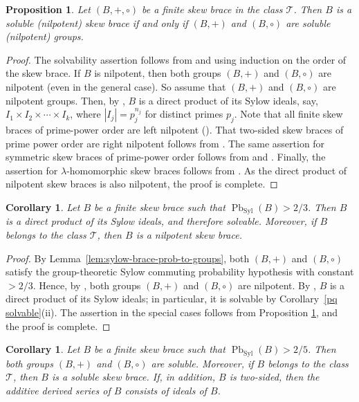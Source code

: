 \documentclass[10pt,a4paper]{amsart}
\numberwithin{equation}{section}
\newtheorem{cor}[equation]{Corollary}
\newtheorem{pro}[equation]{Proposition}
\newcommand{\Pb}{\operatorname{Pb} }
\newcommand{\Syl}{\operatorname{Syl} }
\begin{document}
\begin{pro}\label{soluble group iff soluble skew brace}
    Let $(B, +, \circ)$ be a finite skew brace in the class $\mathcal{T}$. Then $B$ is a soluble (nilpotent)  skew brace if and only if  $(B,+)$ and $(B,\circ)$ are soluble (nilpotent)  groups.
\end{pro}
\begin{proof}
   The solvability assertion follows from \cite[Theorem 3.11, Theorem 3.13]{ST2023} and \cite[Theorem 4.20]{T2023} using induction on the order of the skew brace. If $B$ is nilpotent, then both groups $(B,+)$ and $(B,\circ)$ are nilpotent (even in the general case). So assume that $(B,+)$ and $(B,\circ)$ are nilpotent groups. Then, by \cite[Corollary 4.3.]{CSV19}, $B$ is a direct product of its Sylow ideals, say, $I_1\times I_2\times \cdots \times I_k $, where $|I_j| = p_j^{n_j}$ for distinct primes  $p_j$.
   Note that all finite skew braces of prime-power order are left nilpotent (\cite[Proposition 4.4.]{CSV19}). That two-sided skew braces of prime power order are right nilpotent follows from  \cite[Lemma 4.2]{MY26}. The same assertion for symmetric skew braces of prime-power order follows from \cite[Proposition 4.4]{CSV19} and \cite[Corollary 3.8]{T2023}. Finally, the assertion for $\lambda$-homomorphic skew braces follows from \cite[Theorem 3.13.]{ST2023}.  As the direct product of nilpotent skew braces is also nilpotent, the proof is complete.
\end{proof}


\begin{cor} %
Let $B$ be a finite skew brace such that $\Pb_{\Syl}(B)>2/3$.  Then
$B$ is a direct product of its Sylow ideals, and therefore  solvable. Moreover, if $B$ belongs to the class $\mathcal{T}$, then $B$ is a nilpotent skew brace. 
\end{cor}
\begin{proof}
By Lemma~\ref{lem:sylow-brace-prob-to-groups}, both $(B,+)$ and
$(B,\circ)$ satisfy the group-theoretic Sylow commuting probability
hypothesis with constant $>2/3$. Hence, by \cite{DLMS25}, both groups $(B,+)$ and $(B,\circ)$ are nilpotent. By \cite[Corollary~4.3]{CSV19}, $B$ is a direct product of its Sylow ideals; in particular, it is solvable by Corollary~\ref{pq solvable}(ii). The assertion in the special cases follows from 
Proposition \ref{soluble group iff soluble skew brace}, and the proof is complete.
\end{proof}
\begin{cor} %
Let $B$ be a finite skew brace such that $\Pb_{\Syl}(B)>2/5$.  Then
both groups $(B,+)$ and $(B,\circ)$ are soluble. 
Moreover, if $B$ belongs to the class $\mathcal T$, then $B$ is a soluble skew brace. If, in addition, $B$ is two-sided, then the additive derived series of $B$ consists of ideals of $B$.

\end{cor}
\end{document}
